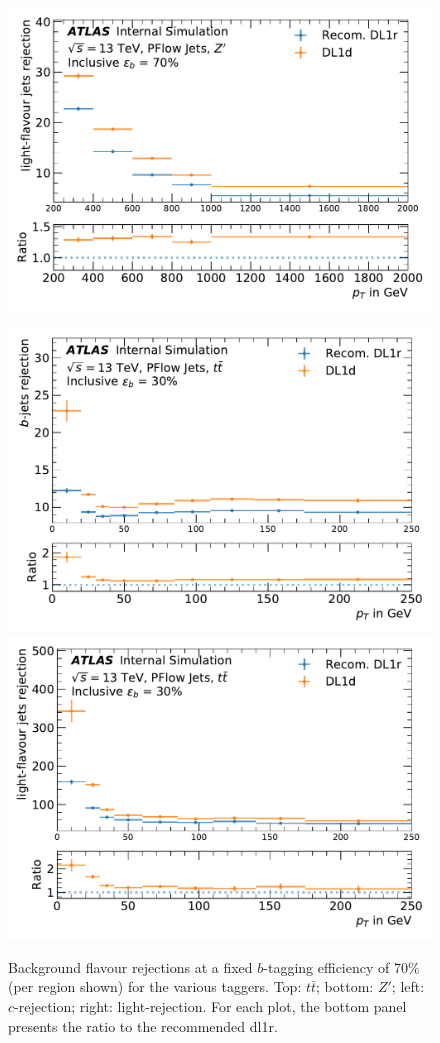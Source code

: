 \begin{center}
\begin{figure}[h!]
{\includegraphics[scale=0.425]{Images//FTAG/Reprocessed/plotting_eff_vs_pt/pT_vs_beff_u_zp_300.pdf}
}
\caption{Background flavour rejections at a fixed $b$-tagging efficiency of 70\% (per region shown) for the various taggers. Top: $t\bar{t}$; bottom: $Z'$; left: $c$-rejection; right: light-rejection. For each plot, the bottom panel presents the ratio to the recommended \gls{dl1r}.}
\label{fig:ptDL1dtt}
\bigskip
\centerline{
\includegraphics[scale=0.425]{Images//FTAG/Reprocessed/plotting_eff_vs_pt_c/pT_vs_beff_c_tt_299.pdf}
\includegraphics[scale=0.425]{Images//FTAG/Reprocessed/plotting_eff_vs_pt_c/pT_vs_beff_u_tt_299.pdf}}

\end{figure}
\end{center}
